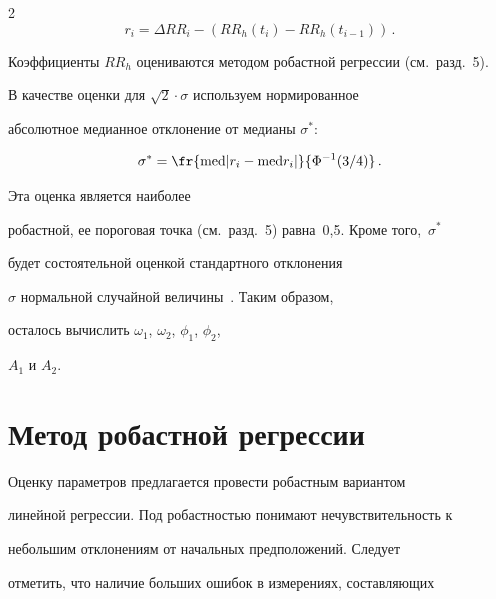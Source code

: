 \begin{multicols}{2}
\begin{equation*}




r_i = \Delta RR_i - \left(RR_h(t_i)-RR_h(t_{i-1})\right)\,.


\end{equation*}


Коэффициенты $RR_h$ оцениваются методом робастной регрессии (см.\ разд.~5).





В качестве оценки для $\sqrt{2}\cdot\sigma$ используем нормированное


абсолютное медианное отклонение от медианы $\sigma^*$:


\begin{equation*}




\sigma^* = \fr{\med|r_i-\med


r_i|}{\Phi^{-1}(3/4)}\,.


\end{equation*}


Эта оценка является наиболее


робастной, ее пороговая точка (см.\ разд.~5) равна~0,5. Кроме того,~$\sigma^*$ 


будет состоятельной оценкой стандартного отклонения


$\sigma$ нормальной случайной величины~\cite{5ma}. Таким образом,


осталось вычислить $\omega_1$, $\omega_2$, $\phi_1$, $\phi_2$,


$A_1$ и $A_2$.





\section{Метод робастной регрессии \label{sect_robustregr} } %





Оценку параметров предлагается провести робастным вариантом


линейной регрессии. Под робастностью понимают нечувствительность к\linebreak


небольшим отклонениям от начальных предположений. Следует


отметить, что наличие больших ошибок в измерениях, составляющих



\end{multicols}
